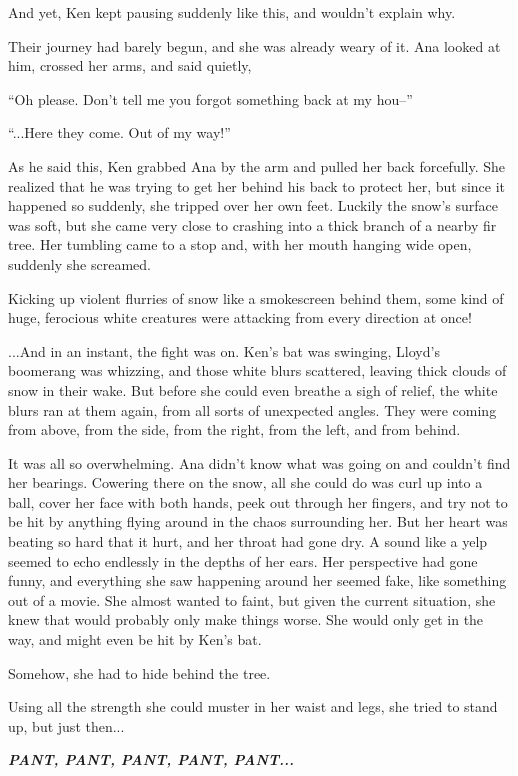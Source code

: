 \documentclass[
]{article}
\begin{document}
And yet, Ken kept pausing suddenly like this, and wouldn't explain why.

Their journey had barely begun, and she was already weary of it. Ana
looked at him, crossed her arms, and said quietly,

``Oh please. Don't tell me you forgot something back at my hou--''

``...Here they come. Out of my way!''

As he said this, Ken grabbed Ana by the arm and pulled her back
forcefully. She realized that he was trying to get her behind his back
to protect her, but since it happened so suddenly, she tripped over her
own feet. Luckily the snow's surface was soft, but she came very close
to crashing into a thick branch of a nearby fir tree. Her tumbling came
to a stop and, with her mouth hanging wide open, suddenly she screamed.

Kicking up violent flurries of snow like a smokescreen behind them, some
kind of huge, ferocious white creatures were attacking from every
direction at once!

...And in an instant, the fight was on. Ken's bat was swinging, Lloyd's
boomerang was whizzing, and those white blurs scattered, leaving thick
clouds of snow in their wake. But before she could even breathe a sigh
of relief, the white blurs ran at them again, from all sorts of
unexpected angles. They were coming from above, from the side, from the
right, from the left, and from behind.

It was all so overwhelming. Ana didn't know what was going on and
couldn't find her bearings. Cowering there on the snow, all she could do
was curl up into a ball, cover her face with both hands, peek out
through her fingers, and try not to be hit by anything flying around in
the chaos surrounding her. But her heart was beating so hard that it
hurt, and her throat had gone dry. A sound like a yelp seemed to echo
endlessly in the depths of her ears. Her perspective had gone funny, and
everything she saw happening around her seemed fake, like something out
of a movie. She almost wanted to faint, but given the current situation,
she knew that would probably only make things worse. She would only get
in the way, and might even be hit by Ken's bat.

Somehow, she had to hide behind the tree.

Using all the strength she could muster in her waist and legs, she tried
to stand up, but just then...

\emph{\textbf{PANT, PANT, PANT, PANT, PANT...}}
\end{document}
